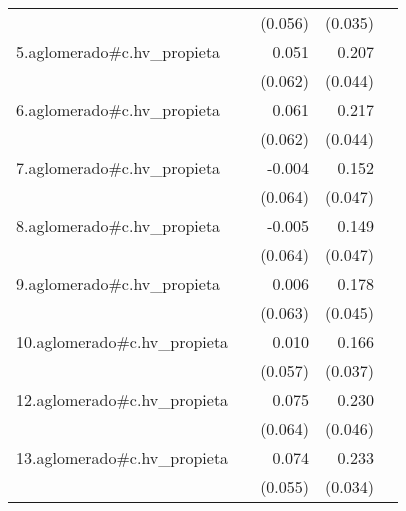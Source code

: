{\begin{longtable}{l*{4}{D{.}{.}{-1}}}
            &                     &     (0.056)         &     (0.035)         &                     \\
\addlinespace
5.aglomerado#c.hv\_propieta&                     &       0.051         &       0.207\sym{***}&                     \\
            &                     &     (0.062)         &     (0.044)         &                     \\
\addlinespace
6.aglomerado#c.hv\_propieta&                     &       0.061         &       0.217\sym{***}&                     \\
            &                     &     (0.062)         &     (0.044)         &                     \\
\addlinespace
7.aglomerado#c.hv\_propieta&                     &      -0.004         &       0.152\sym{**} &                     \\
            &                     &     (0.064)         &     (0.047)         &                     \\
\addlinespace
8.aglomerado#c.hv\_propieta&                     &      -0.005         &       0.149\sym{**} &                     \\
            &                     &     (0.064)         &     (0.047)         &                     \\
\addlinespace
9.aglomerado#c.hv\_propieta&                     &       0.006         &       0.178\sym{***}&                     \\
            &                     &     (0.063)         &     (0.045)         &                     \\
\addlinespace
10.aglomerado#c.hv\_propieta&                     &       0.010         &       0.166\sym{***}&                     \\
            &                     &     (0.057)         &     (0.037)         &                     \\
\addlinespace
12.aglomerado#c.hv\_propieta&                     &       0.075         &       0.230\sym{***}&                     \\
            &                     &     (0.064)         &     (0.046)         &                     \\
\addlinespace
13.aglomerado#c.hv\_propieta&                     &       0.074         &       0.233\sym{***}&                     \\
            &                     &     (0.055)         &     (0.034)         &                     \\

\end{longtable}}

